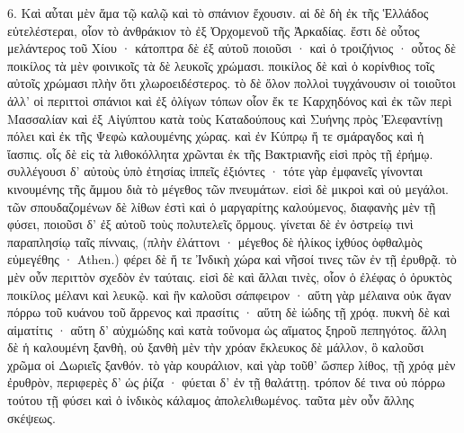 \documentclass[a4paper, 11pt, oneside, polutonikogreek, german]{article}
\begin{document}
6. Καὶ αὗται μὲν ἅμα τῷ καλῷ καὶ τὸ σπάνιον ἔχουσιν. αἱ δὲ δὴ ἐκ τῆς Ἑλλάδος εὐτελέστεραι, οἷον τὸ ἀνθράκιον τὸ ἐξ Ὀρχομενοῦ τῆς Ἀρκαδίας. ἔστι δὲ οὗτος μελάντερος τοῦ Χίου · κάτοπτρα δὲ ἐξ αὐτοῦ ποιοῦσι · καὶ ὁ τροιζήνιος · οὗτος δὲ ποικίλος τὰ μὲν φοινικοῖς τὰ δὲ λευκοῖς χρώμασι. ποικίλος δὲ καὶ ὁ κορίνθιος τοῖς αὐτοῖς χρώμασι πλὴν ὅτι χλωροειδέστερος. τὸ δὲ ὅλον πολλοὶ τυγχάνουσιν οἱ τοιοῦτοι ἀλλ' οἱ περιττοὶ σπάνιοι καὶ ἐξ ὀλίγων τόπων οἷον ἔκ τε Καρχηδόνος καὶ ἐκ τῶν περὶ Μασσαλίαν καὶ ἐξ Αἰγύπτου κατὰ τοὺς Καταδούπους καὶ Συήνης πρὸς Ἐλεφαντίνῃ πόλει καὶ ἐκ τῆς Ψεφὼ καλουμένης χώρας. καὶ ἐν Κύπρῳ ἥ τε σμάραγδος καὶ ἡ ἴασπις. οἷς δὲ εἰς τὰ λιθοκόλλητα χρῶνται ἐκ τῆς Βακτριανῆς εἰσὶ πρὸς τῇ ἐρήμῳ. συλλέγουσι δ' αὐτοὺς ὑπὸ ἐτησίας ἱππεῖς ἐξιόντες · τότε γὰρ ἐμφανεῖς γίνονται κινουμένης τῆς ἄμμου διὰ τὸ μέγεθος τῶν πνευμάτων. εἰσὶ δὲ μικροὶ καὶ οὐ μεγάλοι. τῶν σπουδαζομένων δὲ λίθων ἐστὶ καὶ ὁ μαργαρίτης καλούμενος, διαφανὴς μὲν τῇ φύσει, ποιοῦσι δ' ἐξ αὐτοῦ τοὺς πολυτελεῖς ὅρμους. γίνεται δὲ ἐν ὀστρείῳ τινὶ παραπλησίῳ ταῖς πίνναις, (πλὴν ἐλάττονι · μέγεθος δὲ ἡλίκος ἰχθύος ὀφθαλμὸς εὐμεγέθης · Athen.) φέρει δὲ ἥ τε Ἰνδικὴ χώρα καὶ νῆσοί τινες τῶν ἐν τῇ ἐρυθρᾷ. τὸ μὲν οὖν περιττὸν σχεδὸν ἐν ταύταις. εἰσὶ δὲ καὶ ἄλλαι τινὲς, οἷον ὁ ἐλέφας ὁ ὀρυκτὸς ποικίλος μέλανι καὶ λευκῷ. καὶ ἣν καλοῦσι σάπφειρον · αὕτη γὰρ μέλαινα οὐκ ἄγαν πόρρω τοῦ κυάνου τοῦ ἄρρενος καὶ πρασίτις · αὕτη δὲ ἰώδης τῇ χρόᾳ. πυκνὴ δὲ καὶ αἱματίτις · αὕτη δ' αὐχμώδης καὶ κατὰ τοὔνομα ὡς αἵματος ξηροῦ πεπηγότος. ἄλλη δὲ ἡ καλουμένη ξανθὴ, οὐ ξανθὴ μὲν τὴν χρόαν ἔκλευκος δὲ μάλλον, ὃ καλοῦσι χρῶμα οἱ Δωριεῖς ξανθόν. τὸ γὰρ κουράλιον, καὶ γὰρ τοῦθ' ὥσπερ λίθος, τῇ χρόᾳ μὲν ἐρυθρὸν, περιφερὲς δ' ὡς ῥίζα · φύεται δ' ἐν τῇ θαλάττῃ. τρόπον δέ τινα οὐ πόρρω τούτου τῇ φύσει καὶ ὁ ἰνδικὸς κάλαμος ἀπολελιθωμένος. ταῦτα μὲν οὖν ἄλλης σκέψεως.
\end{document}
